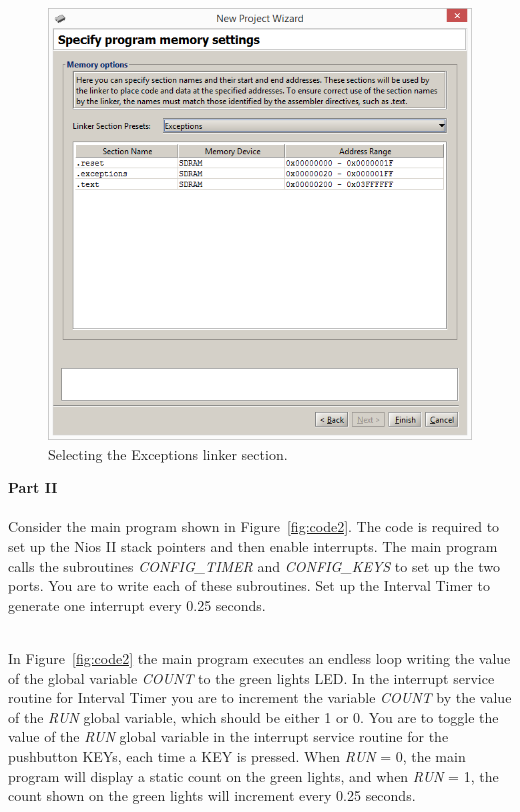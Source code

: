 \documentclass[epsfig,10pt,fullpage]{article}
\begin{document}
\begin{figure}[h]
	\begin{center}
	\includegraphics[scale=0.58]{figures/exceptions.png}
	\end{center}
	\vspace{-0.25cm}\caption{Selecting the {\sf Exceptions} linker section.}
\label{fig:exceptions}
\end{figure}

\noindent
{\bf Part II}
~\\
~\\
\noindent
Consider the main program shown in Figure~\ref{fig:code2}. The code is required to set up 
the Nios II stack pointers and then enable interrupts. The main program calls the
subroutines {\it CONFIG\_TIMER} and {\it CONFIG\_KEYS} to set up the two ports. You
are to write each of these subroutines. Set up the Interval Timer to generate one interrupt
every 0.25 seconds.

~\\
\noindent
In Figure~\ref{fig:code2} the main program executes an endless loop writing the value of
the global variable {\it COUNT} to the green lights LED.  In the interrupt service routine for 
Interval Timer you are to increment the variable {\it COUNT} by the value of 
the {\it RUN} global variable, 
which should be either 1 or 0.  You are to toggle the value of the {\it RUN} global variable 
in the interrupt service routine for the pushbutton KEYs, each time a KEY is pressed.
When {\it RUN} = 0, the main program will display a static count on the green lights,
and when {\it RUN} = 1, the count shown on the green lights will increment every 0.25 seconds.
\end{document}
